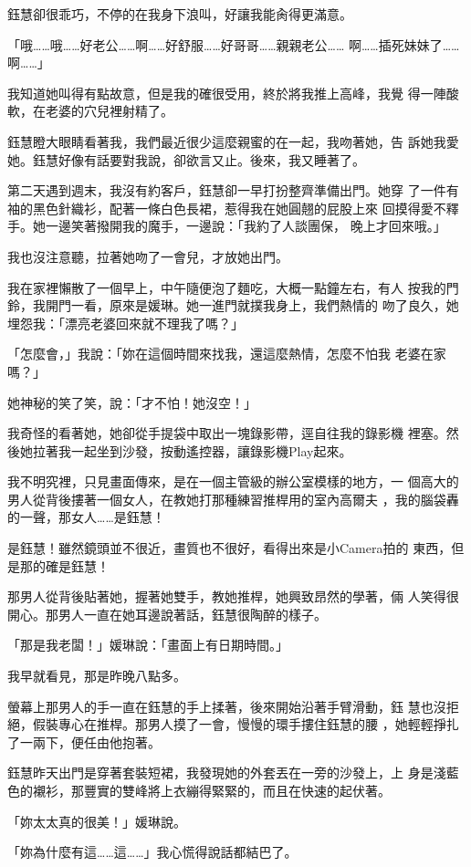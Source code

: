 鈺慧卻很乖巧，不停的在我身下浪叫，好讓我能肏得更滿意。

「哦……哦……好老公……啊……好舒服……好哥哥……親親老公……
啊……插死妹妹了……啊……」

我知道她叫得有點故意，但是我的確很受用，終於將我推上高峰，我覺
得一陣酸軟，在老婆的穴兒裡射精了。

鈺慧瞪大眼睛看著我，我們最近很少這麼親蜜的在一起，我吻著她，告
訴她我愛她。鈺慧好像有話要對我說，卻欲言又止。後來，我又睡著了。

第二天遇到週末，我沒有約客戶，鈺慧卻一早打扮整齊準備出門。她穿
了一件有袖的黑色針織衫，配著一條白色長裙，惹得我在她圓翹的屁股上來
回摸得愛不釋手。她一邊笑著撥開我的魔手，一邊說：「我約了人談團保，
晚上才回來哦。」

我也沒注意聽，拉著她吻了一會兒，才放她出門。

我在家裡懶散了一個早上，中午隨便泡了麵吃，大概一點鐘左右，有人
按我的門鈴，我開門一看，原來是媛琳。她一進門就撲我身上，我們熱情的
吻了良久，她埋怨我：「漂亮老婆回來就不理我了嗎？」

「怎麼會，」我說：「妳在這個時間來找我，還這麼熱情，怎麼不怕我
老婆在家嗎？」

她神秘的笑了笑，說：「才不怕！她沒空！」

我奇怪的看著她，她卻從手提袋中取出一塊錄影帶，逕自往我的錄影機
裡塞。然後她拉著我一起坐到沙發，按動遙控器，讓錄影機Play起來。

我不明究裡，只見畫面傳來，是在一個主管級的辦公室模樣的地方，一
個高大的男人從背後摟著一個女人，在教她打那種練習推桿用的室內高爾夫
，我的腦袋轟的一聲，那女人……是鈺慧！

是鈺慧！雖然鏡頭並不很近，畫質也不很好，看得出來是小Camera拍的
東西，但是那的確是鈺慧！

那男人從背後貼著她，握著她雙手，教她推桿，她興致昂然的學著，倆
人笑得很開心。那男人一直在她耳邊說著話，鈺慧很陶醉的樣子。

「那是我老闆！」媛琳說：「畫面上有日期時間。」

我早就看見，那是昨晚八點多。

螢幕上那男人的手一直在鈺慧的手上揉著，後來開始沿著手臂滑動，鈺
慧也沒拒絕，假裝專心在推桿。那男人摸了一會，慢慢的環手摟住鈺慧的腰
，她輕輕掙扎了一兩下，便任由他抱著。

鈺慧昨天出門是穿著套裝短裙，我發現她的外套丟在一旁的沙發上，上
身是淺藍色的襯衫，那豐實的雙峰將上衣繃得緊緊的，而且在快速的起伏著。

「妳太太真的很美！」媛琳說。

「妳為什麼有這……這……」我心慌得說話都結巴了。

